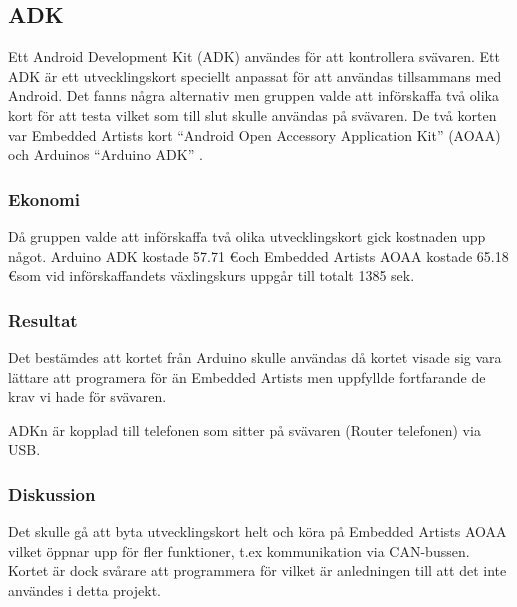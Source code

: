 \subsection{ADK}
Ett Android Development Kit (ADK) användes för att kontrollera svävaren. 
Ett ADK är ett utvecklingskort speciellt anpassat för att användas tillsammans med Android.
Det fanns några alternativ men gruppen valde att införskaffa två olika kort för att testa 
vilket som till slut skulle användas på svävaren. De två korten var Embedded Artists kort 
``Android Open Accessory Application Kit'' (AOAA) \cite{AOAA} och Arduinos ``Arduino ADK'' \cite{Arduino ADK}. 

\subsubsection{Ekonomi}
Då gruppen valde att införskaffa två olika utvecklingskort gick kostnaden upp något. Arduino ADK kostade 57.71 \euro och 
Embedded Artists AOAA kostade 65.18 \euro som vid införskaffandets växlingskurs uppgår till totalt 1385 sek. 

\subsubsection{Resultat}
Det bestämdes att kortet från Arduino skulle användas då kortet visade sig vara 
lättare att programera för än Embedded Artists men uppfyllde fortfarande de krav vi hade för svävaren. 

ADKn är kopplad till telefonen som sitter på svävaren (Router telefonen) via USB.
\subsubsection{Diskussion}
Det skulle gå att byta utvecklingskort helt och köra på Embedded Artists AOAA vilket öppnar upp för fler funktioner, 
t.ex kommunikation via CAN-bussen. Kortet är dock svårare att programmera för vilket är anledningen till att det inte användes
i detta projekt.